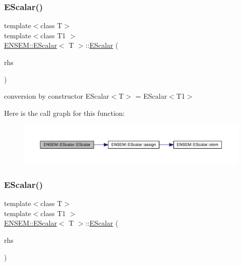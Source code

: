 \subsubsection{\texorpdfstring{EScalar()}{EScalar()}\hspace{0.1cm}{\footnotesize\ttfamily [10/12]}}
{\footnotesize\ttfamily template$<$class T$>$ \\
template$<$class T1 $>$ \\
\mbox{\hyperlink{classENSEM_1_1EScalar}{E\+N\+S\+E\+M\+::\+E\+Scalar}}$<$ T $>$\+::\mbox{\hyperlink{classENSEM_1_1EScalar}{E\+Scalar}} (\begin{DoxyParamCaption}\item[{const \mbox{\hyperlink{classENSEM_1_1EScalar}{E\+Scalar}}$<$ T1 $>$ \&}]{rhs }\end{DoxyParamCaption})\hspace{0.3cm}{\ttfamily [inline]}}



conversion by constructor E\+Scalar$<$\+T$>$ = E\+Scalar$<$\+T1$>$ 

Here is the call graph for this function\+:
\nopagebreak
\begin{figure}[H]
\begin{center}
\leavevmode
\includegraphics[width=350pt]{d0/d82/classENSEM_1_1EScalar_a62e800e98a28c98a6d297eb613e86f82_cgraph}
\end{center}
\end{figure}
\mbox{\label{classENSEM_1_1EScalar_a1436a0e5b8bf00083caf1540f4fc9397}} 
\subsubsection{\texorpdfstring{EScalar()}{EScalar()}\hspace{0.1cm}{\footnotesize\ttfamily [11/12]}}
{\footnotesize\ttfamily template$<$class T$>$ \\
template$<$class T1 $>$ \\
\mbox{\hyperlink{classENSEM_1_1EScalar}{E\+N\+S\+E\+M\+::\+E\+Scalar}}$<$ T $>$\+::\mbox{\hyperlink{classENSEM_1_1EScalar}{E\+Scalar}} (\begin{DoxyParamCaption}\item[{const T1 \&}]{rhs }\end{DoxyParamCaption})\hspace{0.3cm}{\ttfamily [inline]}}



